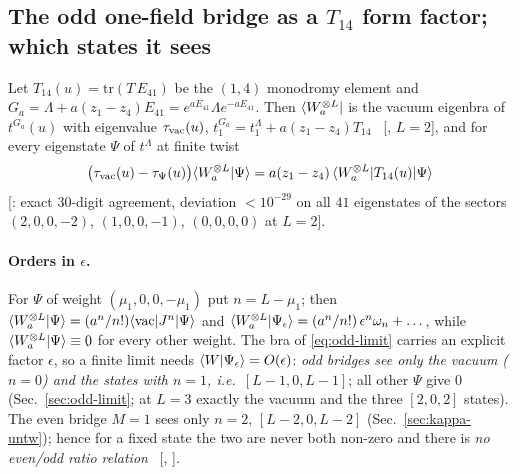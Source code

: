 \subsection{The odd one-field bridge as a $T_{14}$ form factor; which states it sees}\label{sec:odd-ff}

Let $T_{14}(u)=\mathrm{tr}(T\,E_{41})$ be the $(1,4)$ monodromy element and $G_a=\Lambda+a(z_1-z_4)E_{41}=e^{aE_{41}}\Lambda e^{-aE_{41}}$. Then
$\langle W_a^{\otimes L}|$ is the vacuum eigenbra of $t^{G_a}(u)$ with eigenvalue $\tau_{\rm vac}(u)$, $t_1^{G_a}=t_1^\Lambda+a(z_1-z_4)T_{14}$ \ex\ [, $L=2$],
and for every eigenstate $\Psi$ of $t^\Lambda$ at finite twist
\begin{equation}\label{eq:odd-T14}
 \big(\tau_{\rm vac}(u)-\tau_\Psi(u)\big)\langle W_a^{\otimes L}|\Psi\rangle=a(z_1-z_4)\,\langle W_a^{\otimes L}|T_{14}(u)|\Psi\rangle
\end{equation}
[: exact $30$-digit agreement, deviation $<10^{-29}$ on all $41$ eigenstates of the sectors $(2,0,0,-2)$, $(1,0,0,-1)$, $(0,0,0,0)$ at $L=2$].

\paragraph{Orders in $\epsilon$.} For $\Psi$ of weight $(\mu_1,0,0,-\mu_1)$ put $n=L-\mu_1$; then $\langle W_a^{\otimes L}|\Psi\rangle=(a^n/n!)\langle\mathrm{vac}|J^n|\Psi\rangle$
and $\langle W_a^{\otimes L}|\Psi_\epsilon\rangle=(a^n/n!)\,\epsilon^n\omega_n+\dots$, while $\langle W_a^{\otimes L}|\Psi\rangle\equiv0$ for every other weight. The bra of
\eqref{eq:odd-limit} carries an explicit factor $\epsilon$, so a finite limit needs $\langle W|\Psi_\epsilon\rangle=O(\epsilon)$:
\emph{odd bridges see only the vacuum ($n=0$) and the states with $n=1$, i.e.\ $[L-1,0,L-1]$}; all other $\Psi$ give $0$ (Sec.~\ref{sec:odd-limit}; at $L=3$ exactly the vacuum and the three $[2,0,2]$ states).
The even bridge $M=1$ sees only $n=2$, $[L-2,0,L-2]$ (Sec.~\ref{sec:kappa-untw}); hence for a fixed state the two are never both non-zero and
there is \emph{no even/odd ratio relation} \npy\ [, ].

